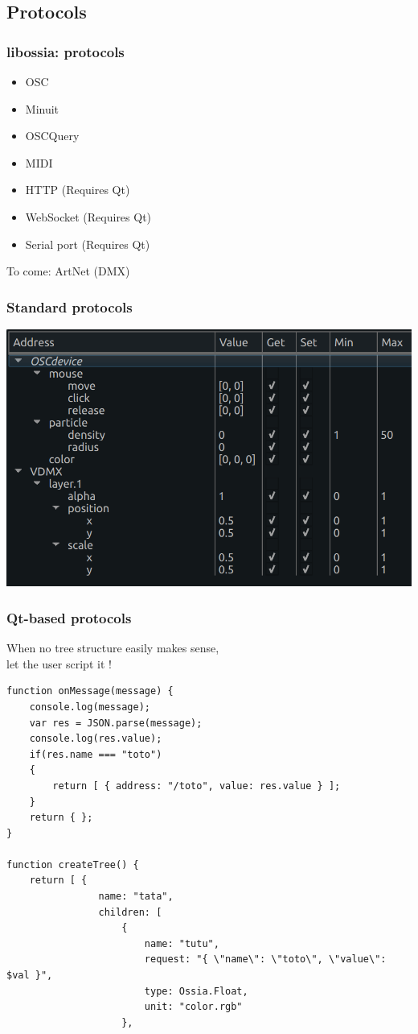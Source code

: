\documentclass[handout]{beamer}
\begin{document}
\subsection{Protocols}
\begin{frame}
\frametitle{libossia: protocols}
\Large
\begin{itemize}
    \item{OSC}
    \item{Minuit}
    \item{OSCQuery}
    \item{MIDI}
    \item{HTTP (Requires Qt)}
    \item{WebSocket (Requires Qt)}
    \item{Serial port (Requires Qt)}
\end{itemize}

To come: ArtNet (DMX)
\end{frame}

\begin{frame}
\frametitle{Standard protocols}
\Large

\includegraphics[width=\textwidth]{images/tree.png}
\end{frame}


\begin{frame}[fragile]
\frametitle{Qt-based protocols}
\Large
When no tree structure easily makes sense,~\\let the user script it !
\footnotesize
\begin{lstlisting}
function onMessage(message) {
    console.log(message);
    var res = JSON.parse(message);
    console.log(res.value);
    if(res.name === "toto")
    {
        return [ { address: "/toto", value: res.value } ];
    }
    return { };
}

function createTree() {
    return [ {
                name: "tata",
                children: [
                    {
                        name: "tutu",
                        request: "{ \"name\": \"toto\", \"value\": $val }",
                        type: Ossia.Float,
                        unit: "color.rgb"
                    },
\end{lstlisting}
\end{frame}
\end{document}
